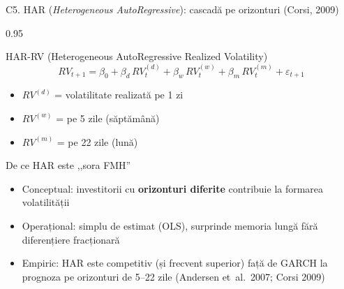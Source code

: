 \documentclass[9pt, aspectratio=169, t]{beamer}
\begin{document}
\begin{frame}[shrink=15]{C5. HAR (\textit{Heterogeneous AutoRegressive}): cascadă pe orizonturi (Corsi, 2009)}
\begin{cminipage}{0.95\textwidth}
\begin{block}{HAR-RV (Heterogeneous AutoRegressive Realized Volatility)}
\[
    RV_{t+1}=\beta_0+\beta_d\,RV_t^{(d)}+\beta_w\,RV_t^{(w)}+\beta_m\,RV_t^{(m)}+\varepsilon_{t+1}
\]
\begin{itemize}\setlength{\itemsep}{0pt}
    \item $RV^{(d)}$ = volatilitate realizată pe 1 zi
    \item $RV^{(w)}$ = pe 5 zile (săptămână)
    \item $RV^{(m)}$ = pe 22 zile (lună)
\end{itemize}
\end{block}
\begin{exampleblock}{De ce HAR este ,,sora FMH''}
\begin{itemize}\setlength{\itemsep}{0pt}
    \item Conceptual: investitorii cu \textbf{orizonturi diferite} contribuie la formarea volatilității
    \item Operațional: simplu de estimat (OLS), surprinde memoria lungă fără diferențiere fracționară
    \item Empiric: HAR este competitiv (și frecvent superior) față de GARCH la prognoza pe orizonturi de 5--22 zile (Andersen et~al.\ 2007; Corsi 2009)
\end{itemize}
\end{exampleblock}
\end{cminipage}
\end{frame}
\end{document}
